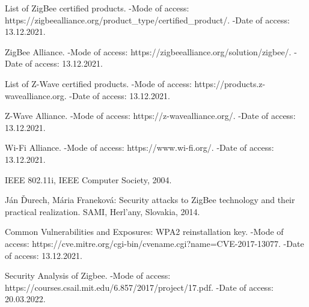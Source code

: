 \newpage
 	
	 \begin{thebibliography}{1}
	 	
	 	 List of ZigBee certified products. -Mode of access: 
	 	\newline https://zigbeealliance.org/product\_type/certified\_product/. -Date of access: 13.12.2021.
	 	
	 	 ZigBee Alliance. -Mode of access: 
	 	\newline https://zigbeealliance.org/solution/zigbee/. -Date of access: 13.12.2021.
	 	
	 	 List of Z-Wave certified products. -Mode of access: 
	 	\newline https://products.z-wavealliance.org. -Date of access: 13.12.2021.
	 	
	 	 Z-Wave Alliance. -Mode of access: 
	 	\newline https://z-wavealliance.org/. -Date of access: 13.12.2021.
	 	
	 	 Wi-Fi Alliance. -Mode of access: 
	 	\newline https://www.wi-fi.org/. -Date of access: 13.12.2021.
	 	
	 	 IEEE 802.11i, IEEE Computer Society, 2004.
	 	
	 	 Ján Ďurech, Mária Franeková: Security attacks to ZigBee technology and their practical realization. 
	 	SAMI,  Herl’any, Slovakia, 2014.
	 	
	 	 Common Vulnerabilities and Exposures: WPA2 reinstallation key. -Mode of access: 
	    https://cve.mitre.org/cgi-bin/cvename.cgi?name=CVE-2017-13077.  \newline -Date of access: 13.12.2021.
	    
	     Security Analysis of Zigbee. -Mode of access: \newline
	    https://courses.csail.mit.edu/6.857/2017/project/17.pdf. -Date of access: 20.03.2022.
	 	
	 \end{thebibliography}